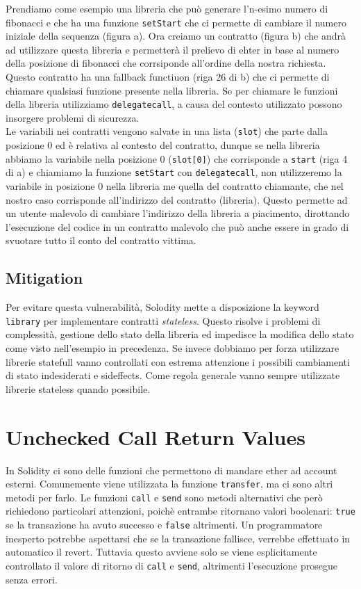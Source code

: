 Prendiamo come esempio una libreria che può generare l'n-esimo numero di fibonacci
e che ha una funzione \verb|setStart| che ci permette di cambiare il numero
iniziale della sequenza (figura a).
Ora creiamo un contratto (figura b) che andrà ad utilizzare questa libreria e
permetterà il prelievo di ehter in base al numero della posizione di fibonacci
che corrsiponde all'ordine della nostra richiesta.
Questo contratto ha una fallback functiuon (riga 26 di b)
che ci permette di chiamare qualsiasi funzione presente nella libreria.
Se per chiamare le funzioni della libreria utilizziamo \verb|delegatecall|,
a causa del contesto utilizzato possono insorgere problemi di sicurezza.\\
Le variabili nei contratti vengono salvate in una lista (\verb|slot|)
che parte dalla posizione $0$ ed è relativa al contesto del contratto,
dunque se nella libreria abbiamo la variabile nella posizione $0$ (\verb|slot[0]|)
che corrisponde a \verb|start| (riga 4 di a) e chiamiamo la funzione
\verb|setStart| con \verb|delegatecall|, non utilizzeremo la variabile in
posizione $0$ nella libreria me quella del contratto chiamante,
che nel nostro caso corrisponde all'indirizzo del contratto (libreria).
Questo permette ad un utente malevolo di
cambiare l'indirizzo della libreria a piacimento, dirottando l'esecuzione
del codice in un contratto malevolo che può anche essere in grado di svuotare
tutto il conto del contratto vittima.

\subsection{Mitigation}

Per evitare questa vulnerabilità, Solodity mette a disposizione la keyword
\verb|library| per implementare contratti \textit{stateless}.
Questo risolve i problemi di complessità, gestione dello stato della libreria ed
impedisce la modifica dello stato come visto nell'esempio in precedenza.
Se invece dobbiamo per forza utilizzare librerie statefull vanno controllati
con estrema attenzione i possibili cambiamenti di stato indesiderati e sideffects.
Come regola generale vanno sempre utilizzate librerie stateless quando possibile.

\section{Unchecked Call Return Values}

In Solidity ci sono delle funzioni che permettono di mandare ether ad account
esterni. Comunemente viene utilizzata la funzione \verb|transfer|, ma ci sono
altri metodi per farlo. Le funzioni \verb|call| e \verb|send| sono metodi
alternativi che però richiedono particolari attenzioni, poichè entrambe
ritornano valori boolenari: \verb|true| se la transazione ha avuto successo e
\verb|false| altrimenti. Un programmatore inesperto potrebbe aspettarsi che se
la transazione fallisce, verrebbe effettuato in automatico il revert.
Tuttavia questo avviene solo se viene esplicitamente controllato il valore di
ritorno di \verb|call| e \verb|send|, altrimenti l'esecuzione prosegue senza errori.

